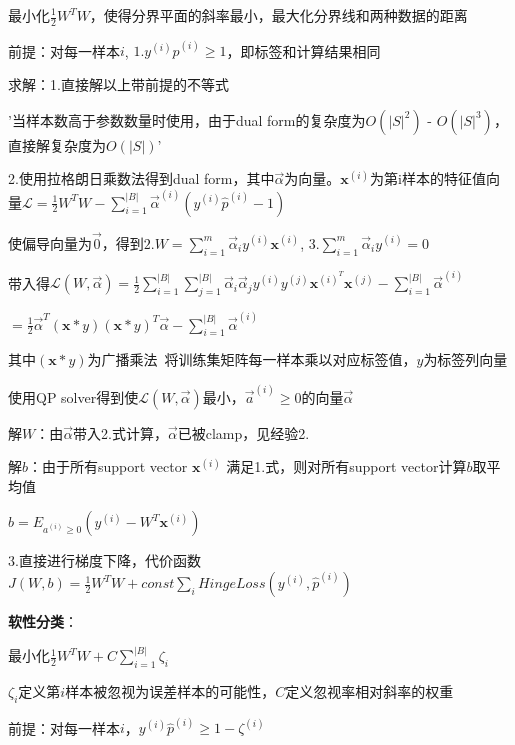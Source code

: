 \documentclass[UTF8]{ctexart}
\begin{document}
  \quad \quad 最小化$\frac{1}{2}W^TW$，使得分界平面的斜率最小，最大化分界线和两种数据的距离

  \quad \quad 前提：对每一样本$i$, $1.y^{(i)}\hat{p}^{(i)} \geq 1$，即标签和计算结果相同

  \quad \quad 求解：1.直接解以上带前提的不等式

  \quad \quad \quad '当样本数高于参数数量时使用，由于dual form的复杂度为$O(|S|^2)$ - $O(|S|^3)$，直接解复杂度为$O(|S|)$'
  
  \quad \quad 2.使用拉格朗日乘数法得到dual form，其中$\vec{\alpha}$为向量。$\mathbf{x}^{(i)}$为第i样本的特征值向量$\mathcal{L} = \frac{1}{2}W^TW - \sum_{i=1}^{|B|}\vec{\alpha}^{(i)}(y^{(i)}\hat{p}^{(i)} - 1)$

  \quad \quad \quad 使偏导向量为$\vec{0} $，得到$2.W = \sum_{i=1}^{m}\vec{\alpha}_iy^{(i)}\mathbf{x}^{(i)}$, $3.\sum_{i=1}^{m}\vec{\alpha}_iy^{(i)}=0$

  \quad \quad \quad 带入得$\mathcal{L} (W, \vec{\alpha}) = \frac{1}{2}\sum_{i=1}^{|B|}\sum_{j=1}^{|B|}\vec{\alpha}_i\vec{\alpha}_jy^{(i)}y^{(j)}\mathbf{x}^{(i)^T}\mathbf{x}^{(j)} - \sum_{i=1}^{|B|}\vec{\alpha}^{(i)}$
  
  \quad \quad \quad \quad $=\frac{1}{2}\vec{\alpha}^T (\mathbf{x} * y)(\mathbf{x} * y)^T \vec{\alpha} - \sum_{i=1}^{|B|}\vec{\alpha}^{(i)}$

  \quad \quad \quad \quad 其中$(\mathbf{x} * y)$为广播乘法\ 将训练集矩阵每一样本乘以对应标签值，$y$为标签列向量

  \quad \quad \quad 使用QP solver得到使$\mathcal{L} (W, \vec{\alpha})$最小，$\vec{a}^{(i)} \geq 0$的向量$\vec{\alpha}$

  \quad \quad \quad 解$W$：由$\vec{\alpha}$带入2.式计算，$\vec{\alpha}$已被clamp，见经验2.

  \quad \quad \quad 解$b$：由于所有support vector $\mathbf{x}^{(i)}$ 满足1.式，则对所有support vector计算$b$取平均值

  \quad \quad \quad \quad $b = E_{a^{(i)} \geq 0}(y^{(i)}-W^T\mathbf{x}^{(i)})$

  \quad \quad 3.直接进行梯度下降，代价函数$J(W, b) = \frac{1}{2}W^TW + const \sum_i HingeLoss(y^{(i)}, \hat{p}^{(i)})$
  
  \quad \textbf{软性分类}：

  \quad \quad 最小化$\frac{1}{2}W^TW + C\sum_{i=1}^{|B|}\zeta_i $

  \quad \quad \quad $\zeta_i$定义第$i$样本被忽视为误差样本的可能性，$C$定义忽视率相对斜率的权重

  \quad \quad 前提：对每一样本$i$，$y^{(i)}\hat{p}^{(i)} \geq 1 - \zeta^{(i)}$
\end{document}
